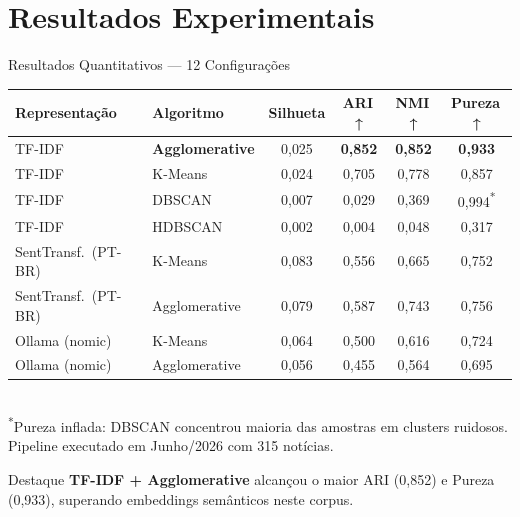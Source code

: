 \documentclass[aspectratio=169]{beamer}
\begin{document}
\section{Resultados Experimentais}
\begin{frame}{Resultados Quantitativos — 12 Configurações}
  {\footnotesize
  \begin{table}[h]
    \centering
    \setlength{\tabcolsep}{5pt}
    \renewcommand{\arraystretch}{1.15}
    \begin{tabular}{llcccc}
      \toprule
      \textbf{Representação} & \textbf{Algoritmo} &
      \textbf{Silhueta} & \textbf{ARI\,↑} & \textbf{NMI\,↑} & \textbf{Pureza\,↑}\\
      \midrule
      \rowcolor{positivegreen!20}
      TF-IDF & \textbf{Agglomerative} & 0{,}025 & \textbf{0{,}852} & \textbf{0{,}852} & \textbf{0{,}933}\\
      TF-IDF & K-Means               & 0{,}024 & 0{,}705 & 0{,}778 & 0{,}857\\
      TF-IDF & DBSCAN                & 0{,}007 & 0{,}029 & 0{,}369 & 0{,}994\textsuperscript{*}\\
      TF-IDF & HDBSCAN               & 0{,}002 & 0{,}004 & 0{,}048 & 0{,}317\\
      \midrule
      SentTransf.\ (PT-BR) & K-Means        & 0{,}083 & 0{,}556 & 0{,}665 & 0{,}752\\
      SentTransf.\ (PT-BR) & Agglomerative  & 0{,}079 & 0{,}587 & 0{,}743 & 0{,}756\\
      \midrule
      Ollama (nomic) & K-Means       & 0{,}064 & 0{,}500 & 0{,}616 & 0{,}724\\
      Ollama (nomic) & Agglomerative & 0{,}056 & 0{,}455 & 0{,}564 & 0{,}695\\
      \bottomrule
    \end{tabular}
    \vspace{0.3em}\\
    {\tiny \textsuperscript{*}Pureza inflada: DBSCAN concentrou maioria das amostras
     em clusters ruidosos. Pipeline executado em Junho/2026 com 315 notícias.}
  \end{table}
  }
  \vspace{-0.5em}
  \begin{block}{\small Destaque}
    \small \textbf{TF-IDF + Agglomerative} alcançou o maior ARI (0{,}852) e Pureza
    (0{,}933), superando embeddings semânticos neste corpus.
  \end{block}
\end{frame}
\end{document}

